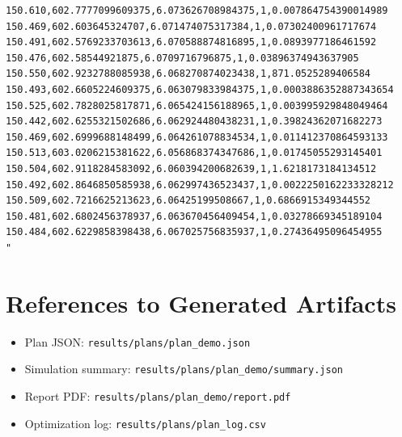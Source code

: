 \documentclass[11pt]{article}
\begin{document}
\begin{verbatim}
150.610,602.7777099609375,6.073626708984375,1,0.007864754390014989
150.469,602.603645324707,6.071474075317384,1,0.07302400961717674
150.491,602.5769233703613,6.070588874816895,1,0.0893977186461592
150.476,602.58544921875,6.0709716796875,1,0.03896374943637905
150.550,602.9232788085938,6.068270874023438,1,871.0525289406584
150.493,602.6605224609375,6.063079833984375,1,0.0003886352887343654
150.525,602.7828025817871,6.065424156188965,1,0.003995929848049464
150.442,602.6255321502686,6.062924480438231,1,0.39824362071682273
150.469,602.6999688148499,6.064261078834534,1,0.011412370864593133
150.513,603.0206215381622,6.056868374347686,1,0.01745055293145401
150.504,602.9118284583092,6.060394200682639,1,1.6218173184134512
150.492,602.8646850585938,6.062997436523437,1,0.0022250162233328212
150.509,602.7216625213623,6.06425199508667,1,0.6866915349344552
150.481,602.6802456378937,6.063670456409454,1,0.03278669345189104
150.484,602.6229858398438,6.067025756835937,1,0.27436495096454955
"\end{verbatim}

\section{References to Generated Artifacts}
\begin{itemize}
  \item Plan JSON: \texttt{results/plans/plan\_demo.json}
  \item Simulation summary: \texttt{results/plans/plan\_demo/summary.json}
  \item Report PDF: \texttt{results/plans/plan\_demo/report.pdf}
  \item Optimization log: \texttt{results/plans/plan\_log.csv}
\end{itemize}
\end{document}

